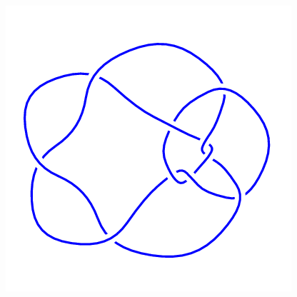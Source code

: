 \begin{figure}[H]
\begin{minipage}[b]{.18\linewidth}
    \end{minipage}
    \begin{minipage}[b]{.18\linewidth}
        \centering
        \includegraphics[width=\linewidth]{../data/10_91.png}
    \end{minipage}
\end{figure}
